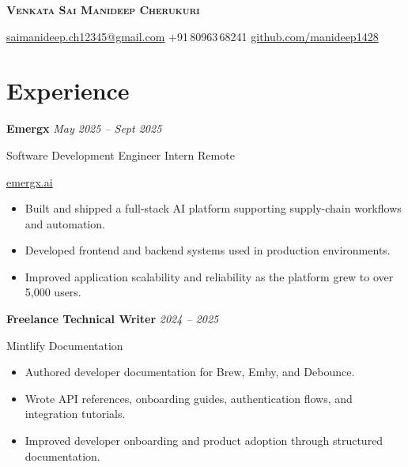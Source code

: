 \documentclass[11pt,letterpaper]{article}
\begin{document}

\begin{center}

{\LARGE\bfseries\scshape Venkata Sai Manideep Cherukuri}

\vspace{4pt}


\vspace{6pt}

{\small
\href{mailto:saimanideep.ch12345@gmail.com}{saimanideep.ch12345@gmail.com}
\quad\textbar\quad
+91\,80963\,68241
\quad\textbar\quad
\href{https://github.com/manideep1428}{github.com/manideep1428}
}

\end{center}


\section{Experience}

\textbf{Emergx}
\hfill
\textit{May 2025 -- Sept 2025}

Software Development Engineer Intern \hfill Remote

{\small \href{https://www.emergx.ai}{emergx.ai}}

\begin{itemize}
    \item Built and shipped a full-stack AI platform supporting supply-chain workflows and automation.
    \item Developed frontend and backend systems used in production environments.
    \item Improved application scalability and reliability as the platform grew to over 5,000 users.
\end{itemize}

\vspace{4pt}

\textbf{Freelance Technical Writer}
\hfill
\textit{2024 -- 2025}

Mintlify Documentation

\begin{itemize}
    \item Authored developer documentation for Brew, Emby, and Debounce.
    \item Wrote API references, onboarding guides, authentication flows, and integration tutorials.
    \item Improved developer onboarding and product adoption through structured documentation.
\end{itemize}
\end{document}
